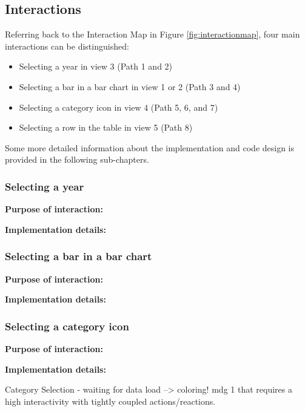 \subsection{Interactions}

Referring back to the Interaction Map in Figure \ref{fig:interactionmap}, four main interactions can be distinguished:
\begin{itemize}[noitemsep,nolistsep]
	\item Selecting a year in view 3 (Path 1 and 2)
	\item Selecting a bar in a bar chart in view 1 or 2 (Path 3 and 4)
	\item Selecting a category icon in view 4 (Path 5, 6, and 7)
	\item Selecting a row in the table in view 5 (Path 8)
\end{itemize}
Some more detailed information about the implementation and code design is provided in the following sub-chapters.


\subsubsection{Selecting a year}

\textbf{Purpose of interaction:}

\textbf{Implementation details:}


\subsubsection{Selecting a bar in a bar chart}

\textbf{Purpose of interaction:}

\textbf{Implementation details:}


\subsubsection{Selecting a category icon}

\textbf{Purpose of interaction:}

\textbf{Implementation details:}


Category Selection - waiting for data load --> coloring!
\gls{mdg} 1 that requires a high interactivity with tightly coupled actions/reactions.



